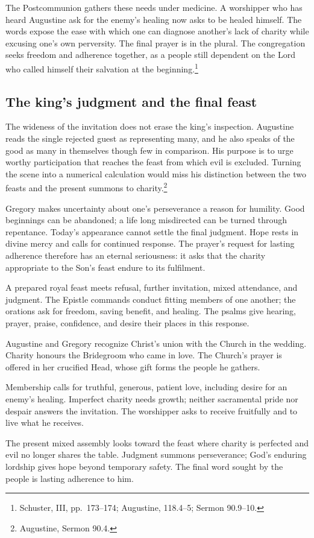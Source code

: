 The Postcommunion gathers these needs under medicine. A
worshipper who has heard Augustine ask for the enemy's healing
now asks to be healed himself. The words expose the ease with
which one can diagnose another's lack of charity while excusing
one's own perversity. The final prayer is in the plural. The
congregation seeks freedom and adherence together, as a people
still dependent on the Lord who called himself their salvation
at the beginning.\footnote{Schuster,  III,
pp.~173--174; Augustine,  118.4--5; Sermon
90.9--10.}

\subsection{The king's judgment and the final feast}

The wideness of the invitation does not erase the king's
inspection. Augustine reads the single rejected guest as
representing many, and he also speaks of the good as many in
themselves though few in comparison. His purpose is to urge
worthy participation that reaches the feast from which evil
is excluded. Turning the scene into a numerical calculation
would miss his distinction between the two feasts and the
present summons to charity.\footnote{Augustine, Sermon 90.4.}

Gregory makes uncertainty about one's perseverance a reason
for humility. Good beginnings can be abandoned; a life long
misdirected can be turned through repentance. Today's
appearance cannot settle the final judgment. Hope rests in
divine mercy and calls for continued response. The prayer's
request for lasting adherence therefore has an eternal
seriousness: it asks that the charity appropriate to the
Son's feast endure to its fulfilment.

\begin{fourSenses}
\item[Literal.] A prepared royal feast meets refusal, further invitation,
mixed attendance, and judgment. The Epistle commands conduct fitting
members of one another; the orations ask for freedom, saving benefit,
and healing. The psalms give hearing, prayer, praise, confidence, and
desire their places in this response.
\item[Allegorical.] Augustine and Gregory recognize Christ's union with
the Church in the wedding. Charity honours the Bridegroom who came in
love. The Church's prayer is offered in her crucified Head, whose gift
forms the people he gathers.
\item[Moral.] Membership calls for truthful, generous, patient love,
including desire for an enemy's healing. Imperfect charity needs growth;
neither sacramental pride nor despair answers the invitation. The
worshipper asks to receive fruitfully and to live what he receives.
\item[Anagogical.] The present mixed assembly looks toward the feast
where charity is perfected and evil no longer shares the table. Judgment
summons perseverance; God's enduring lordship gives hope beyond temporary
safety. The final word sought by the people is lasting adherence to him.
\end{fourSenses}
